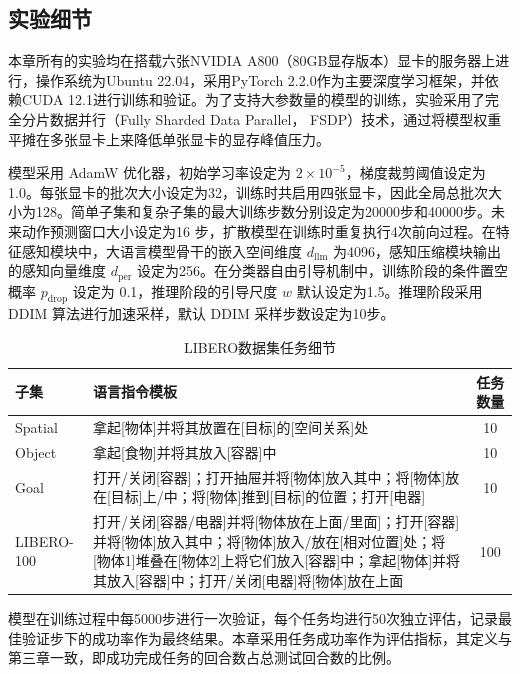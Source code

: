 \subsection{实验细节}
\label{subsec:chap4_training_details}

本章所有的实验均在搭载六张NVIDIA A800（80GB显存版本）显卡的服务器上进行，操作系统为Ubuntu 22.04，采用PyTorch 2.2.0作为主要深度学习框架，并依赖CUDA 12.1进行训练和验证。为了支持大参数量的模型的训练，实验采用了完全分片数据并行（Fully Sharded Data Parallel， FSDP）\cite{zhao2023pytorch}技术，通过将模型权重平摊在多张显卡上来降低单张显卡的显存峰值压力。

模型采用 AdamW 优化器，初始学习率设定为 $2 \times 10^{-5}$，梯度裁剪阈值设定为1.0。每张显卡的批次大小设定为32，训练时共启用四张显卡，因此全局总批次大小为128。简单子集和复杂子集的最大训练步数分别设定为20000步和40000步。未来动作预测窗口大小设定为16 步，扩散模型在训练时重复执行4次前向过程。在特征感知模块中，大语言模型骨干的嵌入空间维度 $d_{\text{llm}}$ 为4096，感知压缩模块输出的感知向量维度 $d_{\text{per}}$ 设定为256。在分类器自由引导机制中，训练阶段的条件置空概率 $p_{\text{drop}}$ 设定为 0.1，推理阶段的引导尺度 $w$ 默认设定为1.5。推理阶段采用 DDIM 算法进行加速采样，默认 DDIM 采样步数设定为10步。

\begin{table}[H]
  \centering
  \caption{LIBERO数据集任务细节}
  \label{tab:libero_tasks}
  \begin{tabular}{lp{}c}
    \toprule
    子集 & 语言指令模板 & 任务数量 \\
    \midrule
    Spatial & 拿起[物体]并将其放置在[目标]的[空间关系]处 & 10 \\
    Object & 拿起[食物]并将其放入[容器]中 & 10 \\
    Goal & 打开/关闭[容器]；打开抽屉并将[物体]放入其中；将[物体]放在[目标]上/中；将[物体]推到[目标]的位置；打开[电器] & 10 \\
    LIBERO-100 & 打开/关闭[容器/电器]并将[物体放在上面/里面]；打开[容器]并将[物体]放入其中；将[物体]放入/放在[相对位置]处；将[物体1]堆叠在[物体2]上将它们放入[容器]中；拿起[物体]并将其放入[容器]中；打开/关闭[电器]将[物体]放在上面 & 100 \\
    \bottomrule
  \end{tabular}
\end{table}

模型在训练过程中每5000步进行一次验证，每个任务均进行50次独立评估，记录最佳验证步下的成功率作为最终结果。本章采用任务成功率作为评估指标，其定义与第三章一致，即成功完成任务的回合数占总测试回合数的比例。
